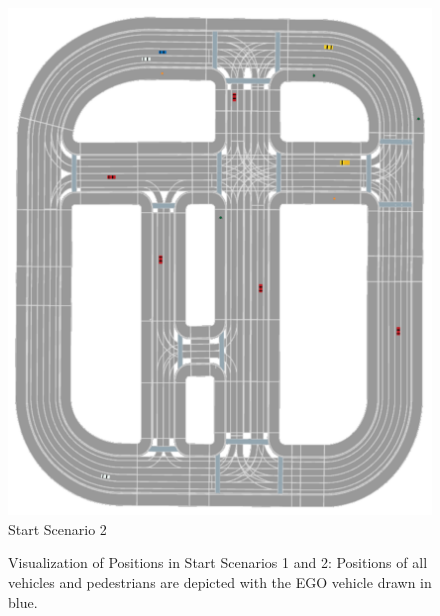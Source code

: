 \begin{figure}[ht]
\begin{minipage}[b]{0.5\linewidth}
		\includegraphics[width=1\linewidth]{figures/start_scenarios/scenario_2} 
		Start Scenario 2
	\end{minipage} 
	\caption{Visualization of Positions in Start Scenarios 1 and 2: Positions of all vehicles and pedestrians are depicted with the EGO vehicle drawn in blue.}
	\label{fig:appendix:start_scenarios_1_2} 
\end{figure}

